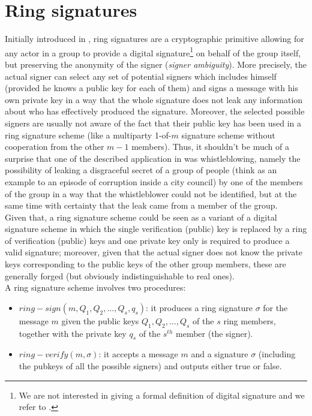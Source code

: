 \section{Ring signatures}
\label{ring_signatures}
Initially introduced in \cite{LeakSecret}, ring signatures are a cryptographic primitive allowing for any actor in a group to provide a digital signature\footnote{We are not interested in giving a formal definition of digital signature and we refer to \cite{UnderstandingCrypto}.} on behalf of the group itself, but preserving the anonymity of the signer (\textit{signer ambiguity}). More precisely, the actual signer can select any set of potential signers which includes himself (provided he knows a public key for each of them) and signs a message with his own private key in a way that the whole signature does not leak any information about who has effectively produced the signature. Moreover, the selected possible signers are usually not aware of the fact that their public key has been used in a ring signature scheme (like a multiparty 1-of-$m$ signature scheme without cooperation from the other $m-1$ members). Thus, it shouldn't be much of a surprise that one of the described application in \cite{LeakSecret} was whistleblowing, namely the possibility of leaking a disgraceful secret of a group of people (think as an example to an episode of corruption inside a city council) by one of the members of the group in a way that the whistleblower could not be identified, but at the same time with certainty that the leak came from a member of the group.\\
Given that, a ring signature scheme could be seen as a variant of a digital signature scheme in which the single verification (public) key is replaced by a ring of verification (public) keys and one private key only is required to produce a valid signature; moreover, given that the actual signer does not know the private keys corresponding to the public keys of the other group members, these are generally forged (but obviously indistinguishable to real ones).\\
A ring signature scheme involves two procedures: \begin{itemize}
    \item $ring-sign(m, Q_1, Q_2, \dots, Q_s, q_s)$: it produces a ring signature $\sigma$ for the message $m$ given the public keys $Q_1, Q_2, \dots, Q_s$ of the $s$ ring members, together with the private key $q_s$ of the $s^{th}$ member (the signer).
    \item $ring-verify(m,\sigma)$: it accepts a message $m$ and a signature $\sigma$ (including the pubkeys of all the possible signers) and outputs either true or false.
\end{itemize}
